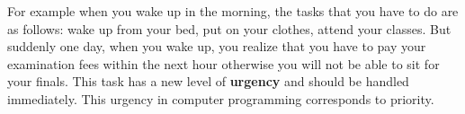For example when you wake up in the morning, the tasks that you have to do are as follows: wake up from your bed, put on your clothes, attend your classes.
But suddenly one day, when you wake up, you realize that you have to pay your examination fees within the next hour otherwise you will not be able to sit for your finals. This task has a new level of \textbf{urgency} and should be handled immediately. This urgency in computer programming corresponds to priority.